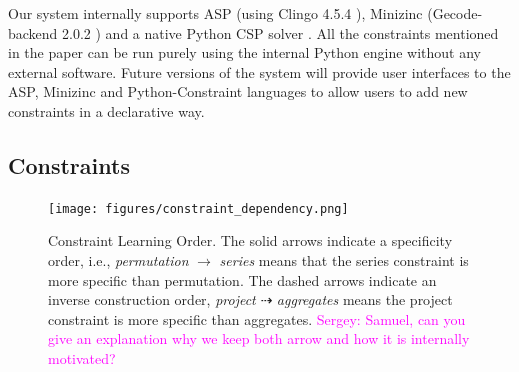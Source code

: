 \documentclass{ecai}
\newcommand{\sergey}[1]{\textcolor{magenta}{{\sc Sergey:} #1}\xspace}
\newcommand{\format}[1]{\textit{#1}\xspace}
\begin{document}
Our system internally supports ASP (using Clingo 4.5.4 \cite{clingo}), Minizinc (Gecode-backend 2.0.2 \cite{minizinc}) and a native Python CSP solver \cite{python_constraint}. All the constraints mentioned in the paper can be run purely using the internal Python engine without any external software. Future versions of the system will provide user interfaces to the ASP, Minizinc and Python-Constraint languages to allow users to add new constraints in a declarative way.

\subsection{Constraints}

\begin{figure}[htb]
  \centering
  \texttt{[image: figures/constraint\_dependency.png]}
  \caption{Constraint Learning Order. The solid arrows indicate a specificity order, i.e., \textit{permutation} $\rightarrow$ \textit{series} means that the series constraint is more specific than permutation. The dashed arrows indicate an inverse construction order, \textit{project} $\dashrightarrow$ \textit{aggregates} means the project constraint is more specific than aggregates. \sergey{Samuel,  can you give an explanation why we keep both arrow and how it is internally motivated?}}
  \label{fig:learning_order}
\end{figure}


\newcommand{\numeric}[1]{\format{numeric}(#1)}
\newcommand{\textual}[1]{\format{textual}(#1)}
\newcommand{\integer}[1]{\format{integer}(#1)}
\newcommand{\length}[1]{\format{length}(#1)}
\newcommand{\nat}{\mathcal{N}}
\end{document}
